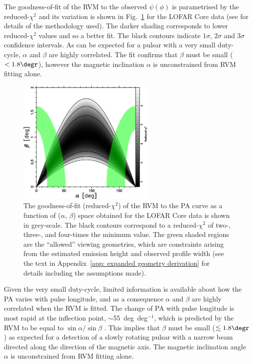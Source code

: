 The goodness-of-fit of the RVM to the observed $\psi(\phi)$ is parametrised by the reduced-$\chi^2$ and its variation is shown in Fig.~\ref{fig: J0250 - banana} for the LOFAR Core data (see \citealt{RWJx2015a} for details of the methodology used). The darker shading corresponds to lower reduced-$\chi^2$ values and so a better fit. The black contours indicate $1\sigma$, $2\sigma$ and $3\sigma$ confidence intervals. As can be expected for a pulsar with a very small duty-cycle, $\alpha$ and $\beta$ are highly correlated. The fit confirms that $\beta$ must be small ($<1.8\degr$), however the magnetic inclination $\alpha$ is unconstrained from RVM fitting alone.
\begin{figure}
    \begin{center}
        \includegraphics[width=0.6\textwidth]{Figures/J0250/banana}
        \caption[The goodness-of-fit of the RVM to the PSR~J0250+5854 PA curve]{The goodness-of-fit (reduced-$\chi^2$) of the RVM to the PA curve as a function of ($\alpha$, $\beta$) space obtained for the LOFAR Core data is shown in grey-scale. The black contours correspond to a reduced-$\chi^2$ of two-, three-, and four-times the minimum value. The green shaded regions are the ``allowed'' viewing geometries, which are constraints arising from the estimated emission height and observed profile width (see the text in Appendix~\ref{app: expanded geometry derivation} for details including the assumptions made).}
        \label{fig: J0250 - banana}
    \end{center}
\end{figure}

Given the very small duty-cycle, limited information is available about how the PA varies with pulse longitude, and as a consequence $\alpha$ and $\beta$ are highly correlated when the RVM is fitted. The change of PA with pulse longitude is most rapid at the inflection point, $\sim$55~deg~deg$^{-1}$, which is predicted by the RVM to be equal to $\sin\alpha / \sin \beta$ \citep{Kxxx1970}. This implies that $\beta$ must be small ($\lesssim1.8\degr$) as expected for a detection of a slowly rotating pulsar with a narrow beam directed along the direction of the magnetic axis. The magnetic inclination angle $\alpha$ is unconstrained from RVM fitting alone.


